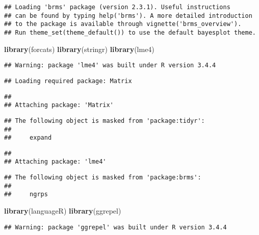 \documentclass[]{article}
\newenvironment{Shaded}{\begin{snugshade}}{\end{snugshade}}
\newcommand{\KeywordTok}[1]{\textcolor[rgb]{0.13,0.29,0.53}{\textbf{#1}}}
\newcommand{\NormalTok}[1]{#1}
\begin{document}
\begin{verbatim}
## Loading 'brms' package (version 2.3.1). Useful instructions
## can be found by typing help('brms'). A more detailed introduction
## to the package is available through vignette('brms_overview').
## Run theme_set(theme_default()) to use the default bayesplot theme.
\end{verbatim}

\begin{Shaded}
\begin{Highlighting}[]
\KeywordTok{library}\NormalTok{(forcats)}
\KeywordTok{library}\NormalTok{(stringr)}
\KeywordTok{library}\NormalTok{(lme4)}
\end{Highlighting}
\end{Shaded}

\begin{verbatim}
## Warning: package 'lme4' was built under R version 3.4.4
\end{verbatim}

\begin{verbatim}
## Loading required package: Matrix
\end{verbatim}

\begin{verbatim}
## 
## Attaching package: 'Matrix'
\end{verbatim}

\begin{verbatim}
## The following object is masked from 'package:tidyr':
## 
##     expand
\end{verbatim}

\begin{verbatim}
## 
## Attaching package: 'lme4'
\end{verbatim}

\begin{verbatim}
## The following object is masked from 'package:brms':
## 
##     ngrps
\end{verbatim}

\begin{Shaded}
\begin{Highlighting}[]
\KeywordTok{library}\NormalTok{(languageR)}
\KeywordTok{library}\NormalTok{(ggrepel)}
\end{Highlighting}
\end{Shaded}

\begin{verbatim}
## Warning: package 'ggrepel' was built under R version 3.4.4
\end{verbatim}
\end{document}
